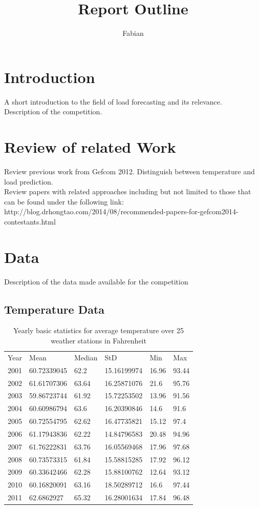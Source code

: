 \documentclass{article}
\begin{document}
\title{Report Outline}
\author{Fabian}

\maketitle

\section{Introduction}
A short introduction to the field of load forecasting and its relevance.\\
Description of the competition.

\section{Review of related Work}
Review previous work from Gefcom 2012. Distinguish between temperature and load prediction.\\
Review papers with related approaches including but not limited to those that can be found under the following link: http://blog.drhongtao.com/2014/08/recommended-papers-for-gefcom2014-contestants.html

\section{Data}
Description of the data made available for the competition
\subsection{Temperature Data}

\begin{table}[h!]
\centering
\begin{tabular}{llllll}
Year & Mean        & Median & StD         & Min   & Max   \\
2001 & 60.72339045 & 62.2   & 15.16199974 & 16.96 & 93.44 \\
2002 & 61.61707306 & 63.64  & 16.25871076 & 21.6  & 95.76 \\
2003 & 59.86723744 & 61.92  & 15.72253502 & 13.96 & 91.56 \\
2004 & 60.60986794 & 63.6   & 16.20390846 & 14.6  & 91.6  \\
2005 & 60.72554795 & 62.62  & 16.47735821 & 15.12 & 97.4  \\
2006 & 61.17943836 & 62.22  & 14.84796583 & 20.48 & 94.96 \\
2007 & 61.76222831 & 63.76  & 16.05569468 & 17.96 & 97.68 \\
2008 & 60.73573315 & 61.84  & 15.58815285 & 17.92 & 96.12 \\
2009 & 60.33642466 & 62.28  & 15.88100762 & 12.64 & 93.12 \\
2010 & 60.16820091 & 63.16  & 18.50289712 & 16.6  & 97.44 \\
2011 & 62.6862927  & 65.32  & 16.28001634 & 17.84 & 96.48
\end{tabular}
\caption{Yearly basic statistics for average temperature over 25 weather stations in Fahrenheit}
\end{table}
\end{document}
